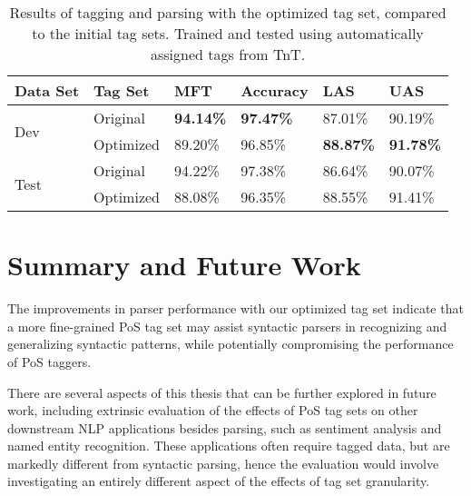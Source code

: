\documentclass[11pt,a4paper]{article}
\begin{document}
\begin{table}
    \centering
    \smaller[0.5]
    \begin{tabular}{@{}llllll@{}}
        \toprule
        \textbf{Data Set} & \textbf{Tag Set} & \textbf{MFT} & \textbf{Accuracy}
        & \textbf{LAS} & \textbf{UAS} \\
        \midrule
        \multirow{2}{*}{Dev}
        & Original & \textbf{94.14\%} & \textbf{97.47\%} & 87.01\% & 90.19\% \\
        & Optimized & 89.20\% & 96.85\% & \textbf{88.87\%} & \textbf{91.78\%} \\
        \midrule
        \multirow{2}{*}{Test}
        & Original & 94.22\% & 97.38\% & 86.64\% & 90.07\% \\
        & Optimized & 88.08\% & 96.35\% & 88.55\% & 91.41\% \\
        \bottomrule
    \end{tabular}
    \caption{Results of tagging and parsing with the optimized tag set,
        compared to the initial tag sets. Trained and tested using
        automatically assigned tags from TnT.}
    \label{finalresults}
\end{table}


\section{Summary and Future Work}
\label{sec:summary}
The improvements in parser performance with our optimized tag set indicate that
a more fine-grained PoS tag set may assist syntactic parsers in recognizing and
generalizing syntactic patterns, while potentially compromising the performance
of PoS taggers.

There are several aspects of this thesis that can be further explored in future
work, including extrinsic evaluation of the effects of PoS tag sets on other
downstream NLP applications besides parsing, such as sentiment analysis and
named entity recognition. These applications often require tagged data, but are
markedly different from syntactic parsing, hence the evaluation would involve
investigating an entirely different aspect of the effects of tag set
granularity.




\end{document}
